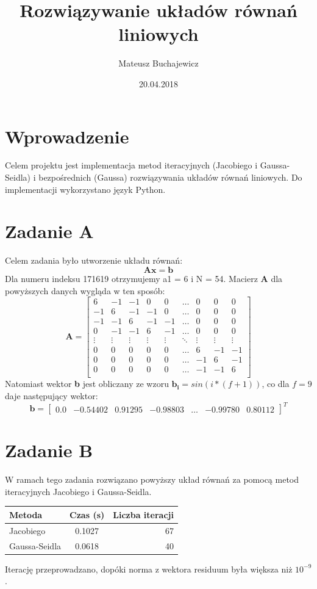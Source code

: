 \documentclass{article} %
\title{Rozwiązywanie układów równań liniowych}
\date{20.04.2018}
\author{Mateusz Buchajewicz}
\begin{document}
\maketitle

\section{Wprowadzenie}
Celem projektu jest implementacja metod iteracyjnych (Jacobiego i Gaussa-Seidla) i
bezpośrednich (Gaussa) rozwiązywania układów równań liniowych. Do implementacji wykorzystano język Python.

\section{Zadanie A}
Celem zadania było utworzenie układu równań:
\begin{equation}
\mathbf{Ax} = \mathbf{b}
\end{equation} 
Dla numeru indeksu 171619 otrzymujemy a1 = 6 i N = 54. \newline
Macierz \textbf{A} dla powyższych danych wygląda w ten sposób: \newline
\[
\textbf{A} = 
\begin{bmatrix}
    6 & -1 & -1 & 0 & 0 &\dots & 0 & 0 & 0 \\
    -1 & 6 & -1 & -1 & 0 & \dots & 0 & 0 & 0\\
    -1 & -1 & 6 & -1 & -1 & \dots & 0 & 0 & 0 \\
    0 & -1 & -1 & 6 & -1 & \dots & 0 & 0 & 0 \\
    \vdots & \vdots & \vdots & \vdots & \vdots & \ddots & \vdots & \vdots & \vdots \\
    0 & 0 & 0 & 0 & 0 & \dots & 6 & -1 & -1 \\
    0 & 0 & 0 & 0 & 0 & \dots & -1 & 6 & -1 \\
    0 & 0 & 0 & 0 & 0 & \dots & -1 & -1 & 6 \\
\end{bmatrix}
\]
Natomiast wektor \textbf{b} jest obliczany ze wzoru \( \mathbf{b_{i}} = sin(i*(f+1))\), co dla \(f = 9\) daje następujący wektor:
\[
    \textbf{b} = 
\begin{bmatrix}
    0.0 & -0.54402 & 0.91295 & -0.98803 & \dots & -0.99780 & 0.80112
\end{bmatrix}^T
\]
\section{Zadanie B}
W ramach tego zadania rozwiązano powyższy układ równań za pomocą metod iteracyjnych Jacobiego i Gaussa-Seidla. \\
\begin{center} 
    \begin{tabular}  { | l | c | r |   }
        \hline
        Metoda & Czas (s) & Liczba iteracji  \\
        \hline
        Jacobiego & 0.1027 & 67 \\
        \hline
        Gaussa-Seidla & 0.0618 & 40 \\
        \hline
    \end{tabular}
\end{center}
Iterację przeprowadzano, dopóki norma z wektora residuum była większa niż \(10^{-9}\).
\newpage
\end{document}
